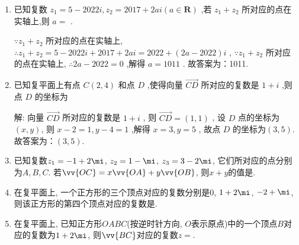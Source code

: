 \begin{enumerate}
    \item 已知复数 $ {z}_{1} = 5 - {2022i},{z}_{2} = {2017} + {2ai}\left( {a \in  \mathbf{R}}\right) $ ,若 $ {z}_{1} + {z}_{2} $ 所对应的点在实轴上,则 $ a = $
    .
    \begin{jieda}
        $ \because {z}_{1} + {z}_{2} $ 所对应的点在实轴上,
        $ \therefore {z}_{1} + {z}_{2} = 5 - {2022i} + {2017} + {2ai} = {2022} + \left( {{2a} - {2022}}\right) i $ ,
        $ \because {z}_{1} + {z}_{2} $ 所对应的点在实轴上,
        $ \therefore {2a} - {2022} = 0 $ ,解得 $ a = {1011} $ .
        故答案为：1011.
    \end{jieda}
    \item 已知复平面上有点 $ C\left( {2,4}\right) $ 和点 $ D $ ,使得向量 $ \overrightarrow{CD} $ 所对应的复数是 $ 1 + i $ ,则点 $ D $ 的坐标为
    \begin{jieda}
        解: 向量 $ \overrightarrow{CD} $ 所对应的复数是 $ 1 + i $ ,
        则 $ \overrightarrow{CD} = \left( {1,1}\right) $ ,
        设 $ D $ 点的坐标为$(x,y)$,
        则 $ x - 2 = 1,y - 4 = 1 $ ,解得 $ x = 3,y = 5 $ ,
        故点 $ D $ 的坐标为$(3, 5)$.
        故答案为：$(3, 5)$.
    \end{jieda}
    \item 已知复数$z_1=-1+2\mi$, $z_2=1-\mi$, $z_3=3-2\mi$, 它们所对应的点分别为$A,B,C$. 若$\vv{OC}=x\vv{OA}+y\vv{OB}$, 则$x+y$的值是. 
    \item 在复平面上, 一个正方形的三个顶点对应的复数分别是$0$, $1+2\mi$, $-2+\mi$, 则该正方形的第四个顶点对应的复数是. 
    \item 在复平面上, 已知正方形$OABC$(按逆时针方向, $O$表示原点)中的一个顶点$B$对应的复数为$1+2\mi$, 则$\vv{BC}$对应的复数$z=$. 
    


\end{enumerate}
